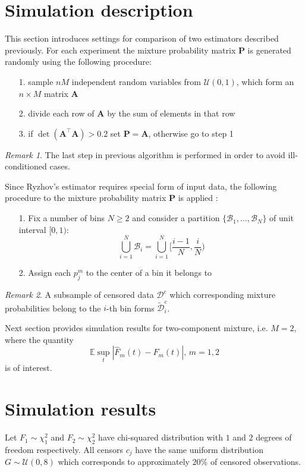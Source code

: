 \documentclass[12pt,reqno,a4paper,oneside]{article}
\theoremstyle{plain}
\theoremstyle{definition}
\theoremstyle{remark}
\newtheorem*{rem}{Remark}
\begin{document}
\section{Simulation description}
\label{sec:Simulation_description}
This section introduces settings for comparison of two estimators described previously. For each experiment the mixture probability matrix $\mathbf P$ is generated randomly using the following procedure:
\begin{itemize}
	\item[1.] sample $n M$ independent random variables from $\mathcal U(0, 1)$, which form an $n\times M$ matrix $\mathbf A$
	\item[2.] divide each row of $\mathbf A$ by the sum of elements in that row
	\item[3.] if $\det (\mathbf A ^\top \mathbf A) > 0.2$ set $\mathbf P = \mathbf A$, otherwise go to step 1
\end{itemize}
\begin{rem}
The last step in previous algorithm is performed in order to avoid ill-conditioned cases.
\end{rem}
Since Ryzhov's estimator requires special form of input data, the following procedure to the mixture probability matrix $\mathbf P$ is applied : 
\begin{itemize}
	\item[1.] Fix a number of bins $N\geq 2$ and consider a partition $\{\mathcal B_1, \ldots, \mathcal B_N\}$ of unit interval $[0, 1)$: $$ \bigcup _{i = 1}^N \mathcal B_i = \bigcup _{i = 1}^N[\frac {i - 1}{N}, \frac iN)$$
	\item[2.] Assign each $p_j^m$ to the center of a bin it belongs to
\end{itemize}
\begin{rem}
A subsample of censored data $\mathcal D^c$ which corresponding mixture probabilities belong to the $i$-th bin forms $\tilde{\mathcal D}_i^c$.
\end{rem}
Next section provides simulation results for two-component mixture, i.e. $M=2$, where the quantity
\begin{equation}
\mathbb E \sup _{t} |\hat F_m(t) - F_m(t)|, \, m=1,2
\end{equation}
is of interest.

\section{Simulation results}
\label{sec:Simulation_results}
Let $F_1\sim \chi ^2_1$ and $F_2\sim \chi ^2_2$ have chi-squared distribution with $1$ and $2$ degrees of freedom respectively. All censors $c_j$ have the same uniform distribution $G\sim \mathcal U(0, 8)$ which corresponds to approximately $20\%$ of censored observations. 
\end{document}

